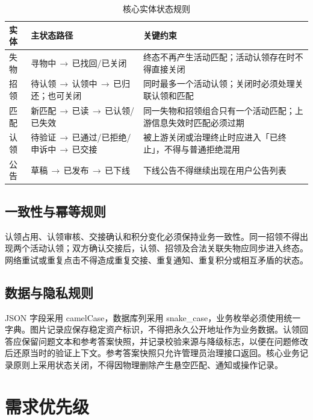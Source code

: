 \begin{table}[H]
  \centering
  \caption{核心实体状态规则}
  \begin{tabularx}{\textwidth}{L{2.4cm} Y Y}
    \toprule
    实体 & 主状态路径 & 关键约束 \\
    \midrule
    失物 & 寻物中\,$\rightarrow$\,已找回/已关闭 & 终态不再产生活动匹配；活动认领存在时不得直接关闭 \\
    招领 & 待认领\,$\rightarrow$\,认领中\,$\rightarrow$\,已归还；也可关闭 & 同时最多一个活动认领；关闭时必须处理关联认领和匹配 \\
    匹配 & 新匹配\,$\rightarrow$\,已读\,$\rightarrow$\,已认领/已失效 & 同一失物和招领组合只有一个活动匹配；上游信息失效时匹配必须过期 \\
    认领 & 待验证\,$\rightarrow$\,已通过/已拒绝/申诉中\,$\rightarrow$\,已交接 & 被上游关闭或治理终止时应进入「已终止」，不得与普通拒绝混用 \\
    公告 & 草稿\,$\rightarrow$\,已发布\,$\rightarrow$\,已下线 & 下线公告不得继续出现在用户公告列表 \\
    \bottomrule
  \end{tabularx}
\end{table}

\subsection{一致性与幂等规则}

认领占用、认领审核、交接确认和积分变化必须保持业务一致性。同一招领不得出现两个活动认领；双方确认交接后，认领、招领及合法关联失物应同步进入终态。网络重试或重复点击不得造成重复交接、重复通知、重复积分或相互矛盾的状态。

\subsection{数据与隐私规则}

JSON 字段采用 camelCase，数据库列采用 snake\_case，业务枚举必须使用统一字典。图片记录应保存稳定资产标识，不得把永久公开地址作为业务数据。认领回答应保留问题文本和参考答案快照，并记录校验来源与降级标志，以便在问题修改后还原当时的验证上下文。参考答案快照只允许管理员治理接口返回。核心业务记录原则上采用状态关闭，不得因物理删除产生悬空匹配、通知或操作记录。

\section{需求优先级}

